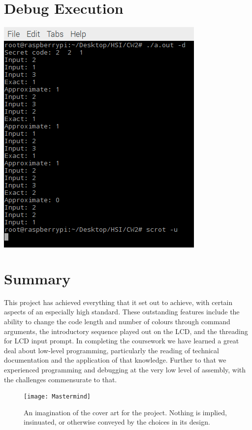 \documentclass[a4paper, titlepage]{article}
\begin{document}
\section{Debug Execution}
\begin{center}
	\includegraphics{Debug}
\end{center}


\section{Summary}
This project has achieved everything that it set out to achieve, with certain aspects of an especially high standard. These outstanding features include the ability to change the code length and number of colours through command arguments, the introductory sequence played out on the LCD, and the threading for LCD input prompt. In completing the coursework we have learned a great deal about low-level programming, particularly the reading of technical documentation and the application of that knowledge. Further to that we experienced programming and debugging at the very low level of assembly, with the challenges commensurate to that.


\begin{figure}
	\centering
	\texttt{[image: Mastermind]}
	\caption{An imagination of the cover art for the project. Nothing is implied, insinuated, or otherwise conveyed by the choices in its design.}
\end{figure}
\end{document}

